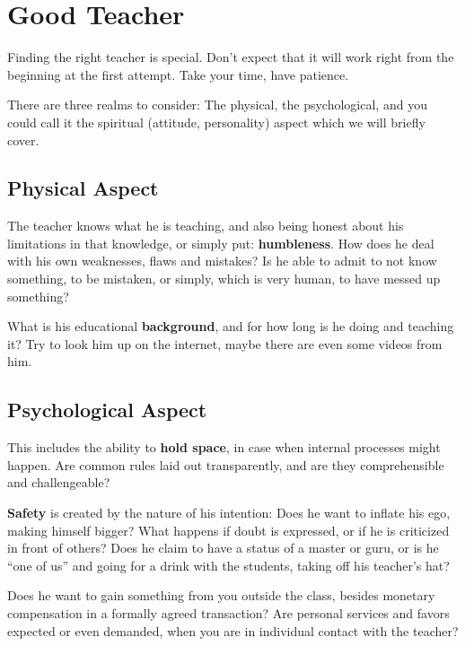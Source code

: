 \section{Good Teacher}\label{sec:good-teacher}

Finding the right teacher is special.
Don’t expect that it will work right from the beginning at the first attempt.
Take your time, have patience.

There are three realms to consider: The physical, the psychological, and you could call it the spiritual (attitude, personality) aspect which we will briefly cover.

\subsection{Physical Aspect}\label{subsec:physical-aspect}

The teacher knows what he is teaching, and also being honest about his limitations in that knowledge, or simply put: \textbf{humbleness}.
How does he deal with his own weaknesses, flaws and mistakes?
Is he able to admit to not know something, to be mistaken, or simply, which is very human, to have messed up something?

What is his educational \textbf{background}, and for how long is he doing and teaching it?
Try to look him up on the internet, maybe there are even some videos from him.

\subsection{Psychological Aspect}\label{subsec:psychological-aspect}

This includes the ability to \textbf{hold space}, in case when internal processes might happen.
Are common rules laid out transparently, and are they comprehensible and challengeable?

\textbf{Safety} is created by the nature of his intention: Does he want to inflate his ego, making himself bigger?
What happens if doubt is expressed, or if he is criticized in front of others?
Does he claim to have a status of a master or guru, or is he ``one of us'' and going for a drink with the students, taking off his teacher's hat?

Does he want to gain something from you outside the class, besides monetary compensation in a formally agreed transaction?
Are personal services and favors expected or even demanded, when you are in individual contact with the teacher?

